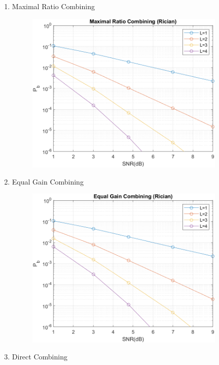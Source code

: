 \documentclass{article}
\begin{document}
\begin{flushleft}
\begin{enumerate}
\begin{enumerate}
\begin{figure}[H]
			\end{figure}
\newpage
		\item Maximal Ratio Combining\\
			\begin{figure}[H]
			\centering
			\includegraphics[width=0.9\textwidth, height=0.4\textheight]{Rician_MRC}
			\end{figure}
		\item Equal Gain Combining\\
			\begin{figure}[H]
			\centering
			\includegraphics[width=0.9\textwidth, height=0.4\textheight]{Rician_EGC}
			\end{figure}
\newpage
		\item Direct Combining\\

\end{enumerate}
\end{enumerate}
\end{flushleft}
\end{document}
